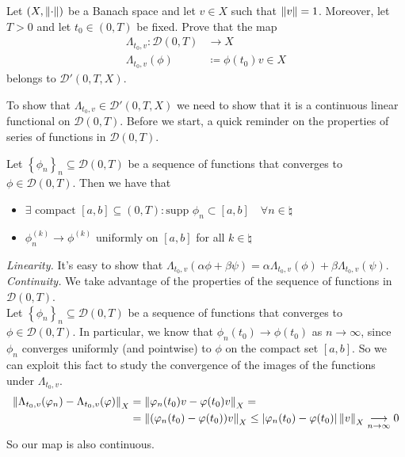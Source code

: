 \newpage
\begin{exercise}
    Let \((X, \norm{\cdot})\) be a Banach space and let \(v \in X\) such that \(\norm{v} = 1\). Moreover, let \(T > 0\) and let \(t_0 \in (0, T)\) be fixed. Prove that the map 
    \begin{align*}
        \Lambda_{t_0, v} \colon \mathcal{D}(0, T) &\to X \\
        \Lambda_{t_0, v}(\phi) &\coloneqq \phi(t_0) v \in X
    \end{align*}
    belongs to \(\mathcal{D}'(0, T, X)\).
\end{exercise}
To show that \(\Lambda_{t_0, v} \in \mathcal{D}'(0, T, X)\) we need to show that it is a continuous linear functional on \(\mathcal{D}(0, T)\). 
Before we start, a quick reminder on the properties of series of functions in \(\mathcal{D}(0, T)\).
\begin{remark}
    Let \(\left\{ \phi_n \right\}_{n} \subseteq \mathcal{D}(0, T)\) be a sequence of functions that converges to \(\phi \in \mathcal{D}(0, T)\). Then we have that
    \begin{itemize}
        \item \(\exists \text{ compact }[a, b] \subseteq (0, T) \colon \text{supp } \phi_n \subset [a, b] \quad \forall n \in \natural\)
        \item \(\phi_n^{(k)} \to \phi^{(k)}\) uniformly on \([a, b]\) for all \(k \in \natural\)
    \end{itemize}
\end{remark}
\textit{Linearity.} It's easy to show that \(\Lambda_{t_0, v}(\alpha \phi + \beta \psi) = \alpha \Lambda_{t_0, v}(\phi) + \beta \Lambda_{t_0, v}(\psi)\).\\
\textit{Continuity.} 
We take advantage of the properties of the sequence of functions in \(\mathcal{D}(0, T)\). \\
Let \(\left\{ \phi_n \right\}_{n} \subseteq \mathcal{D}(0, T)\) be a sequence of functions
that converges to \(\phi \in \mathcal{D}(0, T)\). In particular, we know that \(\phi_n(t_0) \to \phi(t_0)\) as \(n \to \infty\), since \(\phi_n\) converges uniformly (and pointwise) to \(\phi\) on the compact set \([a, b]\).
So we can exploit this fact to study the convergence of the images of the functions under \(\Lambda_{t_0, v}\).
\[
    \begin{split}
        \norm{\Lambda_{t_0, v}(\varphi_n) - \Lambda_{t_0, v}(\varphi)}_X & = \norm{\varphi_n(t_0) v - \varphi(t_0) v}_X =\\
                                                                   & = \norm{(\varphi_n(t_0) - \varphi(t_0)) v}_X \leq \abs{\varphi_n(t_0) - \varphi(t_0)} \, \norm{v}_X \underset{n \to \infty}{\longrightarrow} 0
    \end{split}
\]
So our map is also continuous.

